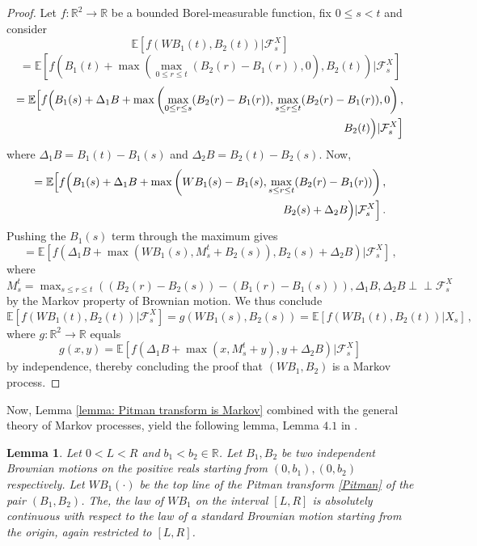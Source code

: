 \documentclass[12pt]{report}
\theoremstyle{plain}
\newtheorem{lemma}[theorem]{Lemma}
\newcommand{\R}{\ensuremath{\mathbb{R}}}
\newcommand{\indep}{\perp \!\!\! \perp}
\begin{document}
\begin{proof}
    Let $f:\R^2\to\R$ be a bounded Borel-measurable function, fix $0\leq s<t$ and consider
    \[
    \mathbb{E}[f(WB_1(t),B_2(t))|\mathcal{F}_s^{X}]
    \]
    \[
    = \mathbb{E}\left[f\left(B_1(t)+\max\left(\max_{0\leq r\leq t}(B_2(r)-B_1(r)),0\right),B_2(t)\right)|\mathcal{F}_s^{X}\right]
    \]
    \begin{equation*}
    \begin{aligned}
    = \mathbb{E}\Bigl[f\Bigl(B_1(s)+\Delta_1B+\max\left(\max_{0\leq r\leq s}(B_2(r)-B_1(r)),
    \max_{s\leq r\leq t}(B_2(r)-B_1(r)),0\right),\\
    B_2(t)\Bigr)|\mathcal{F}_s^{X}\Bigr]
    \end{aligned}
    \end{equation*}
    where $\Delta_1B = B_1(t)-B_1(s)$ and $\Delta_2B = B_2(t)-B_2(s)$. Now,
    \begin{equation*}
    \begin{aligned}
        = \mathbb{E}\Bigl[f\Bigl(B_1(s)+\Delta_1B+\max\left(WB_1(s)-B_1(s),
        \max_{s\leq r\leq t}(B_2(r)-B_1(r))\right),\\
        B_2(s)+\Delta_2B\Bigr)|\mathcal{F}_s^{X}\Bigr]\,.
    \end{aligned}
    \end{equation*}
    Pushing the $B_1(s)$ term through the maximum gives
    \[
    = \mathbb{E}\left[f\left(\Delta_1B+\max\left(WB_1(s),
    M_s^t+B_2(s)\right), B_2(s)+\Delta_2B\right)|\mathcal{F}_s^{X}\right]\,,
    \]
    where $M_s^t = \displaystyle\max_{s\leq r\leq t}((B_2(r)-B_2(s))-(B_1(r)-B_1(s))), \Delta_1B, \Delta_2B \indep \mathcal{F}_s^{X}$ by the Markov property of Brownian motion. We thus conclude
    \[
     \mathbb{E}[f(WB_1(t),B_2(t))|\mathcal{F}_s^{X}] = g(WB_1(s), B_2(s)) = \mathbb{E}[f(WB_1(t),B_2(t))|X_s]\,,
    \]
    where $g:\R^2\to \R$ equals
    \[
    g(x,y) = \mathbb{E}\left[f\left(\Delta_1B+\max\left(x,
    M_s^t+y\right), y+\Delta_2B\right)|\mathcal{F}_s^{X}\right]
    \]
    by independence, thereby concluding the proof that $(WB_1, B_2)$ is a Markov process. 
\end{proof}

Now, Lemma \ref{lemma: Pitman transform is Markov} combined with the general theory of Markov processes, yield the following lemma, Lemma $4.1$ in \cite{sarkar2021brownian}. 

\begin{lemma}\label{lemma: top line Pitman}
    Let $0<L<R$ and $b_1<b_2\in\R$. Let $B_1, B_2$ be two independent Brownian motions on the positive reals starting from $(0,b_1), (0,b_2)$ respectively. Let $WB_1(\cdot)$ be the top line of the Pitman transform \ref{Pitman} of the pair $(B_1, B_2)$. The, the law of $WB_1$ on the interval $[L,R]$ is absolutely continuous with respect to the law of a standard Brownian motion starting from the origin, again restricted to $[L,R]$.
\end{lemma}
\end{document}
